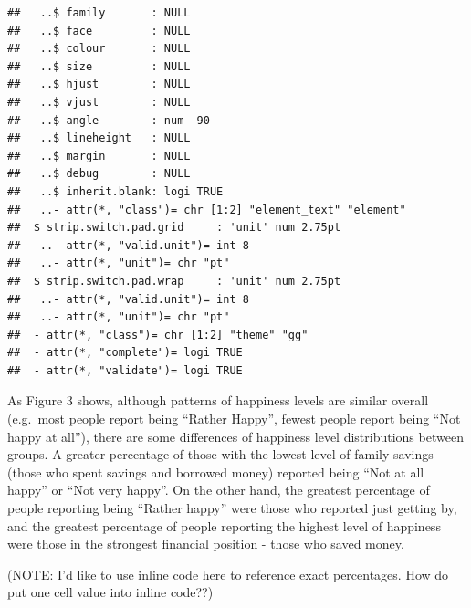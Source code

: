 \documentclass[man]{apa6}
\begin{document}
\begin{verbatim}
##   ..$ family       : NULL
##   ..$ face         : NULL
##   ..$ colour       : NULL
##   ..$ size         : NULL
##   ..$ hjust        : NULL
##   ..$ vjust        : NULL
##   ..$ angle        : num -90
##   ..$ lineheight   : NULL
##   ..$ margin       : NULL
##   ..$ debug        : NULL
##   ..$ inherit.blank: logi TRUE
##   ..- attr(*, "class")= chr [1:2] "element_text" "element"
##  $ strip.switch.pad.grid     : 'unit' num 2.75pt
##   ..- attr(*, "valid.unit")= int 8
##   ..- attr(*, "unit")= chr "pt"
##  $ strip.switch.pad.wrap     : 'unit' num 2.75pt
##   ..- attr(*, "valid.unit")= int 8
##   ..- attr(*, "unit")= chr "pt"
##  - attr(*, "class")= chr [1:2] "theme" "gg"
##  - attr(*, "complete")= logi TRUE
##  - attr(*, "validate")= logi TRUE
\end{verbatim}

As Figure 3 shows, although patterns of happiness levels are similar
overall (e.g.~most people report being \enquote{Rather Happy}, fewest
people report being \enquote{Not happy at all}), there are some
differences of happiness level distributions between groups. A greater
percentage of those with the lowest level of family savings (those who
spent savings and borrowed money) reported being \enquote{Not at all
happy} or \enquote{Not very happy}. On the other hand, the greatest
percentage of people reporting being \enquote{Rather happy} were those
who reported just getting by, and the greatest percentage of people
reporting the highest level of happiness were those in the strongest
financial position - those who saved money.

(NOTE: I'd like to use inline code here to reference exact percentages.
How do put one cell value into inline code??)
\end{document}

